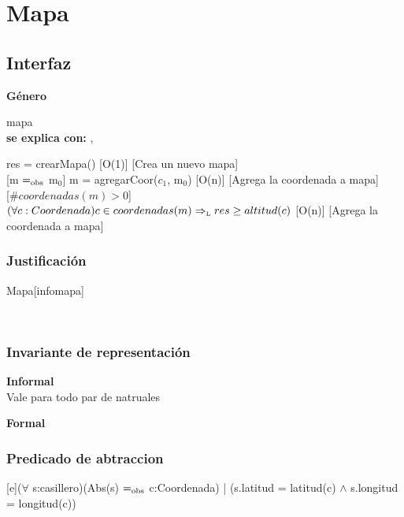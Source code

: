 \section{Mapa}


\subsection{Interfaz}

\parbox {1,7cm}{{\bf Género}} mapa\\
{\bf se explica con:}  , \\
\medskip

{res = crearMapa()}
[O(1)]
[Crea un nuevo mapa]
\\

[m $=_{\mathrm{obs}}$ m$_0$]
{m = agregarCoor($c_1$, m$_0$)}
[O(n)]
[Agrega la coordenada a mapa]
\\

[$\#coordenadas(m) > 0$]
{$(\forall c: Coordenada) c \in coordenadas(m) \Rightarrow_{\mathrm{\scriptscriptstyle{L}}} res \geq altitud(c)$}
[O(n)]
[Agrega la coordenada a mapa]
\\


\begin{Representacion}
\subsubsection{Justificación}
	\begin{Estructura}{Mapa}[infomapa]
		\begin{Tupla}[infomapa]
			\\
		\end{Tupla}
	\end{Estructura}

\subsubsection{Invariante de representación}

\textbf{Informal}\\

Vale para todo par de natruales

\textbf{Formal}\\


\subsubsection{Predicado de abtraccion}

[e]{($\forall$ s:casillero)(Abs(s) $=_{\mathrm{obs}}$ c:Coordenada) | (s.latitud = latitud(c) $\wedge$ s.longitud = longitud(c))}

\end{Representacion}

